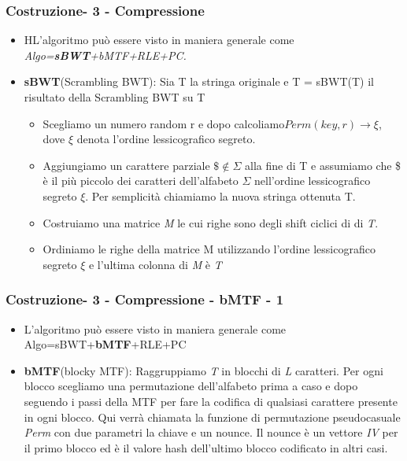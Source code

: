 \documentclass{beamer}
\begin{document}
\begin{frame}
\frametitle{Costruzione- 3 - Compressione}
\begin{itemize}
	\item HL’algoritmo può essere visto in maniera generale come \textit{Algo=\textbf{sBWT}+bMTF+RLE+PC.}
	\item \textbf{sBWT}(Scrambling BWT): Sia T la stringa originale e T = sBWT(T) il risultato della Scrambling BWT su T
		\begin{itemize}
			\item Scegliamo un numero random r e dopo calcoliamo$  Perm(key,r) \rightarrow \xi $, dove $ \xi $ denota l’ordine lessicografico segreto.
			\item Aggiungiamo un carattere parziale $\$ \notin \Sigma$ alla fine di T e assumiamo che \$ è il più piccolo dei caratteri dell'alfabeto $\Sigma$ nell’ordine lessicografico segreto $\xi$. Per semplicità chiamiamo la nuova stringa ottenuta T.
			\item Costruiamo una matrice  \textit{M} le cui righe sono degli shift ciclici di di \textit{T}.
			\item Ordiniamo le righe della matrice M utilizzando l’ordine lessicografico segreto $\xi$  e l’ultima colonna di \textit{M} è \textit{T}
		\end{itemize}
\end{itemize}
\end{frame}

\begin{frame}
\frametitle{Costruzione- 3 - Compressione - bMTF - 1}
	\begin{itemize}
		\item L’algoritmo può essere visto in maniera generale come Algo=sBWT+\textbf{bMTF}+RLE+PC
		\item \textbf{bMTF}(blocky MTF): Raggruppiamo \textit{T} in blocchi di \textit{L} caratteri. Per ogni blocco scegliamo una permutazione dell’alfabeto prima a caso e dopo seguendo i passi della MTF per fare la codifica di qualsiasi carattere presente in ogni blocco. Qui verrà chiamata la funzione di permutazione pseudocasuale \textit{Perm} con due parametri la chiave e un nounce. Il nounce è un vettore \textit{IV} per il primo blocco ed è il valore hash dell’ultimo blocco codificato in altri casi.
		
	\end{itemize}
\end{frame}
\end{document}
